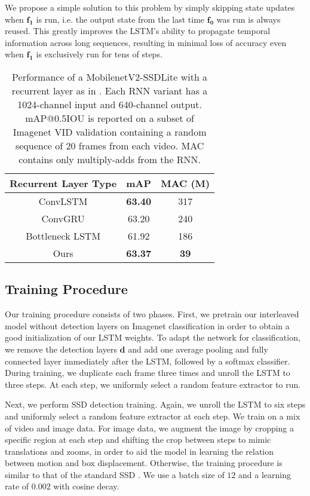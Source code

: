 \documentclass[10pt,twocolumn,letterpaper]{article}
\begin{document}
We propose a simple solution to this problem by simply skipping state updates when $\mathbf{f_1}$ is run, i.e. the output state from the last time $\mathbf{f_0}$ was run is always reused. This greatly improves the LSTM's ability to propagate temporal information across long sequences, resulting in minimal loss of accuracy even when $\mathbf{f_1}$ is exclusively run for tens of steps.

\begin{table}[t]
\begin{tabular}{c | c | c }
Recurrent Layer Type & mAP & MAC (M) \\ 
\toprule [0.2em]
ConvLSTM & \textbf{63.40} & 317 \\
ConvGRU & 63.20 & 240 \\
Bottleneck LSTM \cite{liu2018mobile} & 61.92 & 186 \\
Ours & \textbf{63.37} & \textbf{39} \\
\bottomrule [0.2em]
\end{tabular}
\centering
\caption{Performance of a MobilenetV2-SSDLite with a recurrent layer as in \cite{liu2018mobile}. Each RNN variant has a 1024-channel input and 640-channel output. mAP@0.5IOU is reported on a subset of Imagenet VID validation containing a random sequence of 20 frames from each video. MAC contains only multiply-adds from the RNN.}
\label{tab:lstm}
\end{table}

\subsection{Training Procedure}
Our training procedure consists of two phases. First, we pretrain our interleaved model without detection layers on Imagenet classification in order to obtain a good initialization of our LSTM weights. To adapt the network for classification, we remove the detection layers $\mathbf{d}$ and add one average pooling and fully connected layer immediately after the LSTM, followed by a softmax classifier. During training, we duplicate each frame three times and unroll the LSTM to three steps. At each step, we uniformly select a random feature extractor to run.

Next, we perform SSD detection training. Again, we unroll the LSTM to six steps and uniformly select a random feature extractor at each step. We train on a mix of video and image data. For image data, we augment the image by cropping a specific region at each step and shifting the crop between steps to mimic translations and zooms, in order to aid the model in learning the relation between motion and box displacement. Otherwise, the training procedure is similar to that of the standard SSD \cite{liu2016ssd}. We use a batch size of $12$ and a learning rate of $0.002$ with cosine decay.
\end{document}
